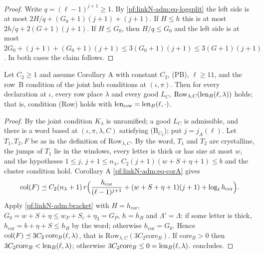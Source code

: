 \begin{proof}
Write $q=(\ell-1)^{j+1}\ge1$. By \eqref{pf:linkN-adm:eq-logsplit} the left side is at most $2H/q+(G_0+1)(j+1)+(j+1)$. If
$H\le h$ this is at most $2h/q+2(G+1)(j+1)$. If $H\le G_0$, then $H/q\le G_0$ and the left side is at most
$2G_0+(j+1)+(G_0+1)(j+1)\le3(G_0+1)(j+1)\le3(G+1)(j+1)$. In both cases the claim follows.
\end{proof}

\begin{proposition}[Row~B]\label{pf:linkN-adm:rowB}
Let $C_2\ge1$ and assume Corollary A with constant $C_2$, (PB), $\ell\ge11$, and
the row~B condition of the joint hub conditions at $(\iota,\pi)$. Then for every declaration at $\iota$, every row place
$\lambda$ and every good $L_C$, $\mathrm{Row}_{\lambda,C}(\operatorname{len}_B(\ell,\lambda))$ holds; that is, condition (Row)
holds with $\operatorname{len}_{\mathrm{row}}=\operatorname{len}_B(\ell,\cdot)$.
\end{proposition}

\begin{proof}
By the joint condition $K_\lambda$ is unramified; a good $L_C$ is admissible, and there is a word based at
$(\iota,\pi,\lambda,C)$ satisfying (B$_{C_2}$); put $j=j_A(\ell)$. Let $T_1,T_2,F$ be as in the definition of
$\mathrm{Row}_{\lambda,C}$. By the word, $T_1$ and $T_2$ are crystalline, the jumps of $T_1$ lie in the windows, every letter is
thick or has size at most $w$, and the hypotheses $1\le j$, $j+1\le n_\lambda$, $C_2(j+1)(w+S+\eta+1)\le b$ and the
cluster condition hold. Corollary A \eqref{pf:linkN-adm:eq-corA} gives
\[
\operatorname{col}(F)\preceq C_2(n_\lambda+1)\,r\Bigl(\frac{h_{\mathrm{cor}}}{(\ell-1)^{j+1}}+(w+S+\eta+1)(j+1)
+\log_\ell h_{\mathrm{cor}}\Bigr).
\]
Apply \cref{pf:linkN-adm:bracket} with $H=h_{\mathrm{cor}}$, $G_0=w+S+\eta\le w_P+S_c+\eta_3=G_P$, $h=h_B$ and
$\Lambda'=\Lambda$: if some letter is thick, $h_{\mathrm{cor}}=b+\eta+S\le h_B$ by the word; otherwise
$h_{\mathrm{cor}}=G_0$. Hence $\operatorname{col}(F)\preceq3C_2\,\mathrm{core}_B(\ell,\lambda)$, that is $\mathrm{Row}_{\lambda,C}(3C_2
\mathrm{core}_B)$. If $\mathrm{core}_B>0$ then $3C_2\mathrm{core}_B<\operatorname{len}_B(\ell,\lambda)$; otherwise
$3C_2\mathrm{core}_B\le0=\operatorname{len}_B(\ell,\lambda)$.  concludes.
\end{proof}

